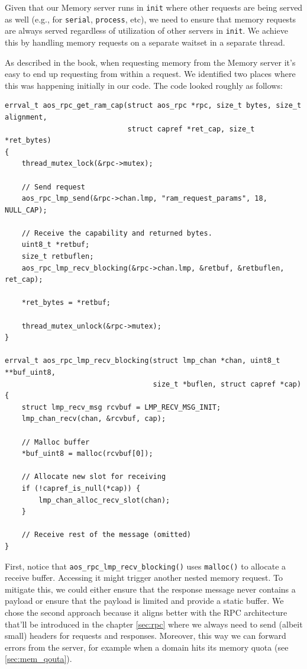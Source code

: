 Given that our Memory server runs in \texttt{init} where other requests are being served as well (e.g., for \texttt{serial}, \texttt{process}, etc), we need to ensure that memory requests are always served regardless of utilization of other servers in \texttt{init}. We achieve this by handling memory requests on a separate waitset in a separate thread.

As described in the book, when requesting memory from the Memory server it's easy to end up requesting from within a request. We identified two places where this was happening initially in our code. The code looked roughly as follows:
\begin{verbatim}
errval_t aos_rpc_get_ram_cap(struct aos_rpc *rpc, size_t bytes, size_t alignment,
                             struct capref *ret_cap, size_t *ret_bytes)
{
    thread_mutex_lock(&rpc->mutex);
    
    // Send request
    aos_rpc_lmp_send(&rpc->chan.lmp, "ram_request_params", 18, NULL_CAP);
    
    // Receive the capability and returned bytes.
    uint8_t *retbuf;
    size_t retbuflen;
    aos_rpc_lmp_recv_blocking(&rpc->chan.lmp, &retbuf, &retbuflen, ret_cap);
    
    *ret_bytes = *retbuf;

    thread_mutex_unlock(&rpc->mutex);
}

errval_t aos_rpc_lmp_recv_blocking(struct lmp_chan *chan, uint8_t **buf_uint8,
                                   size_t *buflen, struct capref *cap)
{
    struct lmp_recv_msg rcvbuf = LMP_RECV_MSG_INIT;
    lmp_chan_recv(chan, &rcvbuf, cap);
    
    // Malloc buffer
    *buf_uint8 = malloc(rcvbuf[0]);
    
    // Allocate new slot for receiving
    if (!capref_is_null(*cap)) {
        lmp_chan_alloc_recv_slot(chan);
    }
    
    // Receive rest of the message (omitted)
}
\end{verbatim}

First, notice that \texttt{aos_rpc_lmp_recv_blocking()} uses \texttt{malloc()} to allocate a receive buffer. Accessing it might trigger another nested memory request. To mitigate this, we could either ensure that the response message never contains a payload or ensure that the payload is limited and provide a static buffer. 
We chose the second approach because it aligns better with the RPC architecture that'll be introduced in the chapter \ref{sec:rpc} where we always need to send (albeit small) headers for requests and responses. Moreover, this way we can forward errors from the server, for example when a domain hits its memory quota (see \autoref{sec:mem_qouta}).

